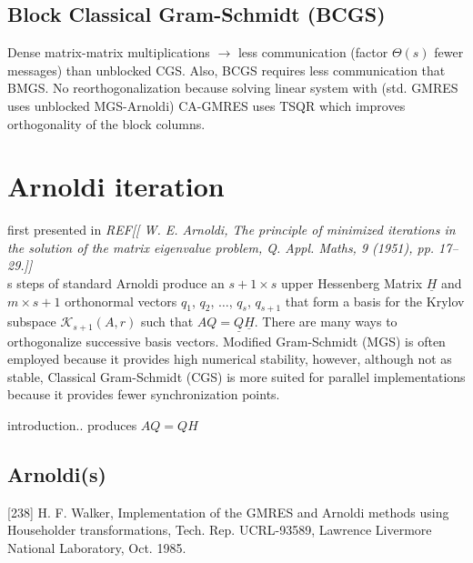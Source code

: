 \documentclass{scrartcl}
\begin{document}
\subsection{Block Classical Gram-Schmidt (BCGS)}
Dense matrix-matrix multiplications $\rightarrow$ less communication (factor $\Theta(s)$ fewer messages) than unblocked CGS. Also, BCGS requires less communication that BMGS.
No reorthogonalization because solving linear system with (std. GMRES uses unblocked MGS-Arnoldi) CA-GMRES uses TSQR which improves orthogonality of the block columns.

\section{Arnoldi iteration}

first presented in \textit{REF[[ W. E. Arnoldi, The principle of minimized iterations in the solution of the matrix eigenvalue problem, Q. Appl. Maths, 9 (1951), pp. 17–29.]]}\\

s steps of standard Arnoldi produce an $s + 1 \times s$ upper Hessenberg Matrix $\underline{H}$ and $m \times s + 1$ orthonormal vectors $q_1$, $q_2$, $\ldots$, $q_s$, $q_{s + 1}$ that form a basis for the Krylov subspace $\mathcal{K}_{s + 1}\left(A,r\right)$ such that $AQ = \underline{Q} \underline{H}$. There are many ways to orthogonalize successive basis vectors. Modified Gram-Schmidt (MGS) is often employed because it provides high numerical stability, however, although not as stable, Classical Gram-Schmidt (CGS) is more suited for parallel implementations because it provides fewer synchronization points.

introduction.. produces $AQ = QH$
\subsection{Arnoldi(s)}

[238] H. F. Walker, Implementation of the GMRES and Arnoldi methods using Householder transformations, Tech. Rep. UCRL-93589, Lawrence Livermore National Laboratory, Oct. 1985.
\end{document}
